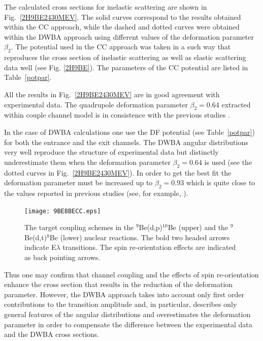 \documentclass[10pt]{iopart}
\begin{document}
The calculated cross sections for inelastic scattering are shown in Fig.~\ref{2H9BE2430MEV}. The solid curves correspond to the results obtained within the CC approach, while the dashed and dotted curves were obtained within the DWBA approach using  different values of the deformation parameter $\beta_2$. The potential used in the CC approach was taken in a such way that reproduces the cross section of inelastic scattering as well as elastic scattering data well (see Fig. \ref{2H9BE}). The parameters of the CC potential are listed in Table~\ref{potpar}.

All the results in Fig.~\ref{2H9BE2430MEV} are in good agreement with experimental data. The quadrupole deformation parameter $\beta_2 = 0.64$ extracted within couple channel model is in consistence with the previous studies \cite{lukyanov2014, harakeh1980}.

In the case of DWBA calculations one use the DF potential (see Table~\ref{potpar}) for both the entrance and the exit channels. The DWBA angular distributions very well reproduce the structure of experimental data but distinctly underestimate them when the deformation parameter $\beta_2 = 0.64$ is used (see the dotted curves in Fig.~\ref{2H9BE2430MEV}). In order to get the best fit the deformation parameter must be increased up to $\beta_2 = 0.93$ which is quite close to the values reported in previous studies (see, for example, \cite{bodek1989, votava1973}).

\begin{figure}[bp]
\centering
\texttt{[image: 9BE8BECC.eps]}
\caption{ \label{9BE8BECC} The target coupling schemes in the $^9$Be(d,p)$^{10}$Be (upper) and the $^9$Be(d,t)$^8$Be (lower) nuclear reactions. The bold two headed arrows indicate E$\lambda$ transitions. The spin re-orientation effects are indicated as back pointing arrows.}
\end{figure}	

Thus one may confirm that channel coupling and the effects of spin re-orientation enhance the cross section that results in the reduction of the deformation parameter. However, the DWBA approach takes into account only first order contributions to the transition amplitude and, in particular, describes only general features of the angular distributions and overestimates the deformation parameter in order to compensate the difference between the experimental data and the DWBA cross sections.

\end{document}
